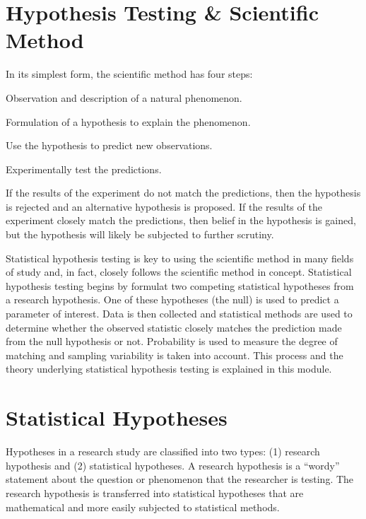 \documentclass[10pt,openany]{book}\usepackage[]{graphicx}\usepackage[]{color}
\begin{document}
\section{Hypothesis Testing \& Scientific Method} \label{sect:SciMethod}
\vspace{-12pt}
In its simplest form, the scientific method has four steps:

\vspace{-12pt}
\begin{Enumerate}
  \item Observation and description of a natural phenomenon.
  \item Formulation of a hypothesis to explain the phenomenon.
  \item Use the hypothesis to predict new observations.
  \item Experimentally test the predictions.
\end{Enumerate}
\vspace{-6pt}

If the results of the experiment do not match the predictions, then the hypothesis is rejected and an alternative hypothesis is proposed.  If the results of the experiment closely match the predictions, then belief in the hypothesis is gained, but the hypothesis will likely be subjected to further scrutiny.

Statistical hypothesis testing is key to using the scientific method in many fields of study and, in fact, closely follows the scientific method in concept.  Statistical hypothesis testing begins by formulat two competing statistical hypotheses from a research hypothesis.  One of these hypotheses (the null) is used to predict a parameter of interest.  Data is then collected and statistical methods are used to determine whether the observed statistic closely matches the prediction made from the null hypothesis or not.  Probability  is used to measure the degree of matching and sampling variability is taken into account.  This process and the theory underlying statistical hypothesis testing is explained in this module.


\section{Statistical Hypotheses} \label{sec:Hypotheses}
\vspace{-12pt}
Hypotheses in a research study are classified into two types: (1) research hypothesis and (2) statistical hypotheses.  A research hypothesis is a ``wordy'' statement about the question or phenomenon that the researcher is testing.  The research hypothesis is transferred into statistical hypotheses that are mathematical and more easily subjected to statistical methods.
\end{document}
